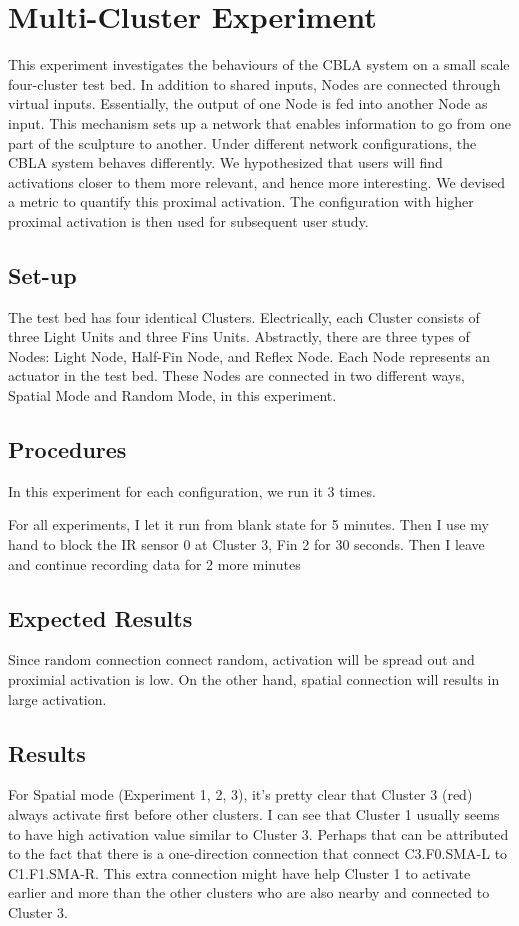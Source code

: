 \section{Multi-Cluster Experiment}\label{sec:multi-cluster-experiment}

This experiment investigates the behaviours of the CBLA system on a small scale four-cluster test bed. In addition to shared inputs, Nodes are connected through virtual inputs. Essentially, the output of one Node is fed into another Node as input. This mechanism sets up a network that enables information to go from one part of the sculpture to another. Under different network configurations, the CBLA system behaves differently. We hypothesized that users will find activations closer to them more relevant, and hence more interesting. We devised a metric to quantify this proximal activation. The configuration with higher proximal activation is then used for subsequent user study. 

\subsection{Set-up}\label{sec:multi-cluster-setup}

The test bed has four identical Clusters. Electrically, each Cluster consists of three Light Units and three Fins Units. Abstractly, there are three types of Nodes: Light Node, Half-Fin Node, and Reflex Node. Each Node represents an actuator in the test bed. These Nodes are connected in two different ways, Spatial Mode and Random Mode, in this experiment.


\subsection{Procedures}
In this experiment for each configuration, we run it 3 times. 

For all experiments, I let it run from blank state for 5 minutes. Then I use my hand to block the IR sensor 0 at Cluster 3, Fin 2 for 30 seconds. Then I leave and continue recording data for 2 more minutes


\subsection{Expected Results}
Since random connection connect random, activation will be spread out and proximial activation is low. On the other hand, spatial connection will results in large activation. 

\subsection{Results}
For Spatial mode (Experiment 1, 2, 3), it's pretty clear that Cluster 3 (red) always activate first before other clusters. I can see that Cluster 1 usually seems to have high activation value similar to Cluster 3. Perhaps that can be attributed to the fact that there is a one-direction connection that connect C3.F0.SMA-L to C1.F1.SMA-R. This extra connection might have help Cluster 1 to activate earlier and more than the other clusters who are also nearby and connected to Cluster 3.


